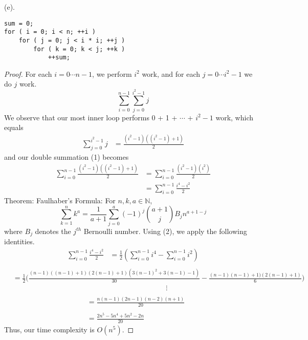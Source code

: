 \documentclass{article}
\begin{document}
(e).
\begin{verbatim}
sum = 0;
for ( i = 0; i < n; ++i )
    for ( j = 0; j < i * i; ++j )
        for ( k = 0; k < j; ++k )
            ++sum;
\end{verbatim}            
\begin{proof}
For each $i = 0 \cdots n-1$, we perform $i^{2}$ work, and for each $j = 0 \cdots i^{2}-1$ we do $j$ work.
\begin{equation}
\sum_{i = 0}^{n-1}\sum_{j = 0}^{i^{2}-1} j
\end{equation}
We observe that our most inner loop performs 0 + 1 + $\cdots$ + $i^{2}-1$ work, which equals
\begin{align*}
\sum_{j=0}^{i^{2}-1} j &= \frac{(i^{2}-1)((i^{2}-1)+1)}{2}
\end{align*}
and our double summation (1) becomes
\begin{align*}
\sum_{i=0}^{n-1} \frac{(i^{2}-1)((i^{2}-1)+1)}{2} &= \sum_{i=0}^{n-1} \frac{(i^{2}-1)(i^{2})}{2}\\
&= \sum_{i=0}^{n-1} \frac{i^{4}-i^2}{2}
\end{align*}
Theorem: Faulhaber's Formula: For $n, k, a \in \mathbb{N}$, 
\begin{equation}
\sum_{k=1}^{n} k^{a} = \frac{1}{a+1} \sum_{j=0}^{a} (-1)^{j} \binom{a+1}{j} B_{j} n^{a+1-j} 
\end{equation}
where $B_j$ denotes the $j^{th}$ Bernoulli number.
Using (2), we apply the following identities.
\begin{align*}
 \sum_{i=0}^{n-1} \frac{i^{4}-i^2}{2} &= \frac{1}{2}(\sum_{i=0}^{n-1} i^{4} - \sum_{i=0}^{n-1} i^{2})\\
 \end{align*}
 \begin{align*}
 &=\frac{1}{2}\bigg(\frac{(n-1)((n-1)+1)(2(n-1)+1)(3(n-1)^{2}+3(n-1)-1)}{30} - \frac{(n-1)(n-1)+1)(2(n-1)+1)}{6}\bigg)\\
&\;\;\;\;\;\;\;\;\;\;\;\;\;\;\;\;\;\;\;\;\;\;\;\;\;\;\;\;\;\;\;\;\;\;\;\;\;\;\;\;\;\;\;\;\;\;\;\;\;\;\;\;\;\;\;\;\;\;\;\;\;\;\;\;\;\;\;\;\;\;\;\;\;\;\;\;\;\vdots\\
\end{align*}
\begin{align*}
&= \frac{n(n-1)(2n-1)(n-2)(n+1)}{20}\\
\\
&= \frac{2n^{5}-5n^{4}+5n^{2}-2n}{20}
\end{align*}
Thus, our time complexity is $O(n^{5}).$

\end{proof}
\end{document}
